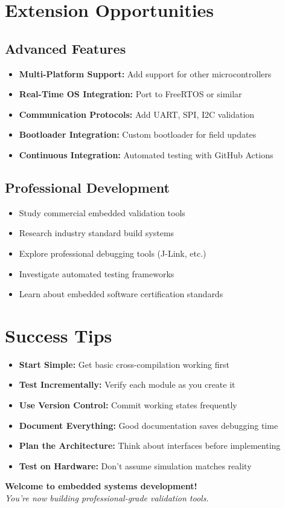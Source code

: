 \documentclass[11pt,a4paper]{article}
\begin{document}
\section{Extension Opportunities}

\subsection{Advanced Features}
\begin{itemize}
    \item \textbf{Multi-Platform Support:} Add support for other microcontrollers
    \item \textbf{Real-Time OS Integration:} Port to FreeRTOS or similar
    \item \textbf{Communication Protocols:} Add UART, SPI, I2C validation
    \item \textbf{Bootloader Integration:} Custom bootloader for field updates
    \item \textbf{Continuous Integration:} Automated testing with GitHub Actions
\end{itemize}

\subsection{Professional Development}
\begin{itemize}
    \item Study commercial embedded validation tools
    \item Research industry standard build systems
    \item Explore professional debugging tools (J-Link, etc.)
    \item Investigate automated testing frameworks
    \item Learn about embedded software certification standards
\end{itemize}

\section{Success Tips}

\begin{itemize}
    \item \textbf{Start Simple:} Get basic cross-compilation working first
    \item \textbf{Test Incrementally:} Verify each module as you create it
    \item \textbf{Use Version Control:} Commit working states frequently
    \item \textbf{Document Everything:} Good documentation saves debugging time
    \item \textbf{Plan the Architecture:} Think about interfaces before implementing
    \item \textbf{Test on Hardware:} Don't assume simulation matches reality
\end{itemize}

\vspace{1cm}

\begin{center}
\textbf{Welcome to embedded systems development!}\\
\textit{You're now building professional-grade validation tools.}
\end{center}
\end{document}
